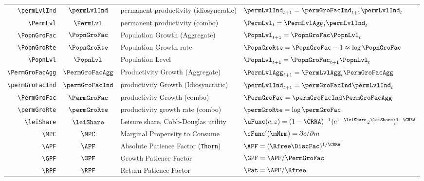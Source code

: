 \documentclass[12pt]{\econtex}
\begin{document}
\begin{table}[ht]
\begin{tabular}{|>{\ttfamily}rcll|}
    \\ \verb|\permLvlInd|  & $\permLvlInd$ & permanent productivity (idiosyncratic) & $\permLvlInd_{t+1} = \permGroFacInd_{t+1}\permLvlInd_{t} $
    \\ \verb|\PermLvl|  & $\PermLvl$ & permanent productivity (combo) & $\PermLvl_{t} = \PermLvlAgg_{t}\permLvlInd_{t} $
    \\ \verb|\PopnGroFac|   & $\PopnGroFac$ & Population Growth (Aggregate) & $\PopnLvl_{t+1} = \PopnGroFac \PopnLvl_{t}$
    \\ \verb|\PopnGroRte|   & $\PopnGroRte$ & Population Growth rate & $\PopnGroRte = \PopnGroFac - 1 \approx \log \PopnGroFac$
    \\ \verb|\PopnLvl|   & $\PopnLvl$ & Population Level & $\PopnLvl_{t+1} = \PopnGroFac_{t+1} \PopnLvl_{t}$
    \\ \verb|\PermGroFacAgg|  & $\PermGroFacAgg$ & Productivity Growth (Aggregate) & $\PermLvlAgg_{t+1}=\PermLvlAgg_{t} \PermGroFacAgg$
    \\ \verb|\permGroFacInd|  & $\permGroFacInd$ & productivity Growth (Idiosyncratic) & $\permLvlInd_{t+1} = \permGroFacInd \permLvlInd_{t}$
    \\ \verb|\PermGroFac|  & $\PermGroFac$ & productivity Growth (combo) & $\PermGroFac = \permGroFacInd \PermGroFacAgg$
    \\ \verb|\permGroRte|  & $\permGroRte$ & productivity growth rate (combo) & $\permGroRte = \log \permGroFac$
    \\ \verb|\leiShare|  & $\leiShare$ & Leisure share, Cobb-Douglas utility & $\uFunc(c,z)=(1-\CRRA)^{-1}(c^{1-\leiShare}z^{\leiShare})^{1-\CRRA}$
    \\ \verb|\MPC|  & $\MPC$ & Marginal Propensity to Consume & $\cFunc^{\prime}(\mNrm)=\partial c/\partial m$
    \\ \verb|\APF|  & $\APF$ & Absolute Patience Factor (\texttt{Thorn}) & $\APF = (\Rfree \DiscFac)^{1/\CRRA} $
    \\ \verb|\GPF| & $\GPF$ & Growth Patience Factor & $\GPF = \APF/\PermGroFac $
    \\ \verb|\RPF| & $\RPF$ & Return Patience Factor & $\Pat = \APF/\Rfree $ 

\end{tabular}
\end{table}
\end{document}
